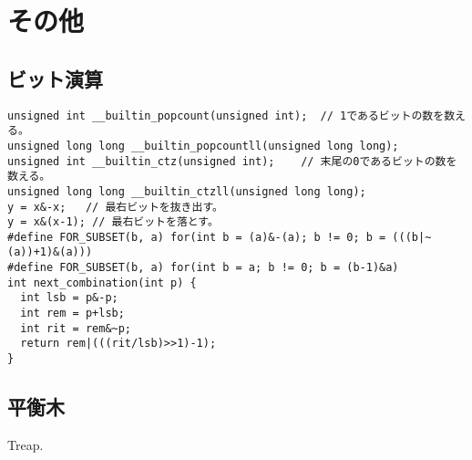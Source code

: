 \section{その他}

\subsection{ビット演算}

\begin{lstlisting}
unsigned int __builtin_popcount(unsigned int);  // 1であるビットの数を数える。
unsigned long long __builtin_popcountll(unsigned long long);
unsigned int __builtin_ctz(unsigned int);    // 末尾の0であるビットの数を数える。
unsigned long long __builtin_ctzll(unsigned long long);
y = x&-x;   // 最右ビットを抜き出す。
y = x&(x-1); // 最右ビットを落とす。
#define FOR_SUBSET(b, a) for(int b = (a)&-(a); b != 0; b = (((b|~(a))+1)&(a)))
#define FOR_SUBSET(b, a) for(int b = a; b != 0; b = (b-1)&a)
int next_combination(int p) {
  int lsb = p&-p;
  int rem = p+lsb;
  int rit = rem&~p;
  return rem|(((rit/lsb)>>1)-1);
}
\end{lstlisting}


\subsection{平衡木}

Treap. 

